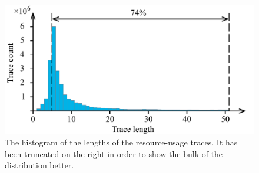 \begin{figure}[t]
  \centering
  \includegraphics[width=1.0\columnwidth]{include/assets/figures/histogram.pdf}
  \caption{
    The histogram of the lengths of the resource-usage traces. It has been
    truncated on the right in order to show the bulk of the distribution better.
  }
\end{figure}
